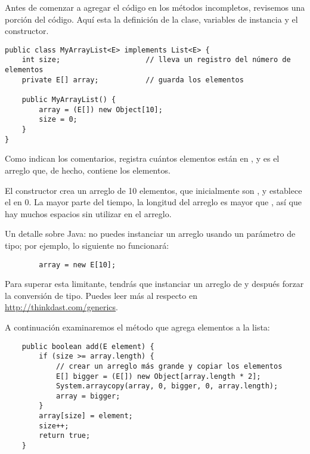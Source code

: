\documentclass[12pt]{book}
\theoremstyle{exercise}
\begin{document}
Antes de comenzar a agregar el código en los métodos incompletos, revisemos
una porción del código. Aquí esta la definición de la clase, variables de instancia
y el constructor.



\begin{verbatim}
public class MyArrayList<E> implements List<E> {
    int size;                    // lleva un registro del número de elementos
    private E[] array;           // guarda los elementos
    
    public MyArrayList() {
        array = (E[]) new Object[10];
        size = 0;
    }
}
\end{verbatim}

Como indican los comentarios,  registra cuántos elementos
están en , y  es el arreglo que, de hecho,
contiene los elementos.


El constructor crea un arreglo de 10 elementos, que inicialmente son
, y establece el  en 0. La mayor parte del tiempo, la
longitud del arreglo es mayor que , así que hay muchos espacios
sin utilizar en el arreglo.


Un detalle sobre Java: no puedes instanciar  un arreglo usando un parámetro
de tipo; por ejemplo, lo siguiente no funcionará:

\begin{verbatim}
        array = new E[10];
\end{verbatim}

Para superar esta limitante, tendrás que instanciar un arreglo de
 y después forzar la conversión de tipo. Puedes leer más al respecto
en \url{http://thinkdast.com/generics}.

A continuación examinaremos el método que agrega elementos a la lista:

\begin{verbatim}
    public boolean add(E element) {
        if (size >= array.length) {
            // crear un arreglo más grande y copiar los elementos
            E[] bigger = (E[]) new Object[array.length * 2];
            System.arraycopy(array, 0, bigger, 0, array.length);
            array = bigger;
        } 
        array[size] = element;
        size++;
        return true;
    }
\end{verbatim}
\end{document}
